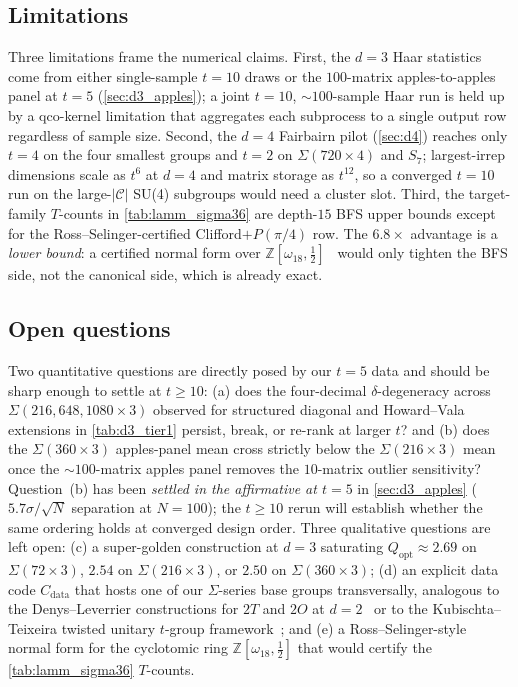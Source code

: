 \documentclass[twocolumn,superscriptaddress,showpacs,nofootinbib,notitlepage,preprintnumbers,secnumarabic,amssymb, nobibnotes, aps, prd]{revtex4-2}
\newcommand{\Popt}{Q_{\mathrm{opt}}} %
\newcommand{\Sigmathree}[1]{\Sigma(#1\!\times\!3)} %
\begin{document}
\subsection{Limitations}\label{sec:discussion_limits}

Three limitations frame the numerical claims. First, the $d=3$ Haar statistics come from either single-sample $t=10$ draws or the $100$-matrix apples-to-apples panel at $t=5$ (\cref{sec:d3_apples}); a joint $t=10$, $\sim\!100$-sample Haar run is held up by a qco-kernel limitation that aggregates each subprocess to a single output row regardless of sample size. Second, the $d=4$ Fairbairn pilot (\cref{sec:d4}) reaches only $t=4$ on the four smallest groups and $t=2$ on $\Sigma(720{\times}4)$ and $S_7$; largest-irrep dimensions scale as $t^6$ at $d=4$ and matrix storage as $t^{12}$, so a converged $t=10$ run on the large-$|\mathcal{C}|$ SU(4) subgroups would need a cluster slot. Third, the target-family $T$-counts in \cref{tab:lamm_sigma36} are depth-$15$ BFS upper bounds except for the Ross--Selinger-certified Clifford$+P(\pi/4)$ row. The $6.8\times$ advantage is a \emph{lower bound}: a certified normal form over $\mathbb{Z}[\omega_{18},\tfrac{1}{2}]$~\cite{Forest:2015cc} would only tighten the BFS side, not the canonical side, which is already exact.

\subsection{Open questions}\label{sec:discussion_open}

Two quantitative questions are directly posed by our $t=5$ data and should be sharp enough to settle at $t \geq 10$: (a) does the four-decimal $\delta$-degeneracy across $\Sigmathree{216,648,1080}$ observed for structured diagonal and Howard--Vala extensions in \cref{tab:d3_tier1} persist, break, or re-rank at larger $t$? and (b) does the $\Sigmathree{360}$ apples-panel mean cross strictly below the $\Sigmathree{216}$ mean once the $\sim\!100$-matrix apples panel removes the $10$-matrix outlier sensitivity? Question~(b) has been \emph{settled in the affirmative at $t=5$} in \cref{sec:d3_apples} ($5.7\sigma/\sqrt{N}$ separation at $N=100$); the $t\geq 10$ rerun will establish whether the same ordering holds at converged design order. Three qualitative questions are left open: (c) a super-golden construction at $d=3$ saturating $\Popt \approx 2.69$ on $\Sigmathree{72}$, $2.54$ on $\Sigmathree{216}$, or $2.50$ on $\Sigmathree{360}$; (d) an explicit data code $C_\mathrm{data}$ that hosts one of our $\Sigma$-series base groups transversally, analogous to the Denys--Leverrier constructions for $2T$ and $2O$ at $d=2$~\cite{DenysLeverrier:2024,DenysLeverrier:2023} or to the Kubischta--Teixeira twisted unitary $t$-group framework~\cite{KubischtaTeixeira:2024}; and (e) a Ross--Selinger-style normal form for the cyclotomic ring $\mathbb{Z}[\omega_{18},\tfrac{1}{2}]$ that would certify the \cref{tab:lamm_sigma36} $T$-counts.
\end{document}

